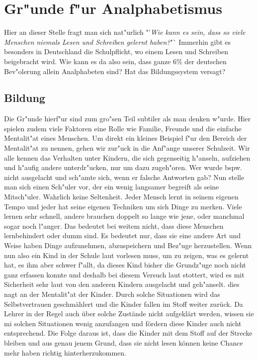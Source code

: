 \section{Gr"unde f"ur Analphabetismus} \label{sec:reasons}



Hier an dieser Stelle fragt man sich nat"urlich "'\textit{Wie kann es sein, dass so viele Menschen niemals Lesen und Schreiben gelernt haben?}"` Immerhin gibt es besonders in Deutschland die Schulpflicht, wo einem Lesen und Schreiben beigebracht wird. Wie kann es da also sein, dass ganze 6\% der deutschen Bev"olerung allein Analphabeten sind? Hat das Bildungssystem versagt? \\


\subsection{Bildung}

Die Gr"unde hierf"ur sind zum gro"sen Teil subtiler als man denken w"urde. Hier spielen zudem viele Faktoren eine Rolle wie Familie, Freunde und die einfache Mentalit"at eines Menschen. Um direkt ein kleines Beispiel f"ur den Bereich der Mentalit"at zu nennen, gehen wir zur"uck in die Anf"ange unserer Schulzeit. Wir alle kennen das Verhalten unter Kindern, die sich gegenseitig h"anseln, aufziehen und h"aufig andere unterdr"ucken, nur um dazu zugeh"oren. Wer wurde bspw. nicht ausgelacht und sch"amte sich, wenn er falsche Antworten gab? Nun stelle man sich einen Sch"uler vor, der ein wenig langsamer begreift als seine Mitsch"uler. Wahrlich keine Seltenheit. Jeder Mensch lernt in seinem eigenen Tempo und jeder hat seine eigenen Techniken um sich Dinge zu merken. Viele lernen sehr schnell, andere brauchen doppelt so lange wie jene, oder manchmal sogar noch l"anger. Das bedeutet bei weitem nicht, dass diese Menschen lernbehindert oder dumm sind. Es bedeutet nur, dass sie eine andere Art und Weise haben Dinge aufzunehmen, abzuspeichern und Bez"uge herzustellen. Wenn nun also ein Kind in der Schule laut vorlesen muss, um zu zeigen, was es gelernt hat, es ihm aber schwer f"allt, da dieses Kind bisher die Grundz"uge noch nicht ganz erfassen konnte und deshalb bei diesem Versuch laut stottert, wird es mit Sicherheit sehr laut von den anderen Kindern ausgelacht und geh"anselt. dies nagt an der Mentalit"at der Kinder. Durch solche Situationen wird das Selbstvertrauen geschmählert und die Kinder fallen im Stoff weiter zurück. Da Lehrer in der Regel auch über solche Zustände nicht aufgeklärt werden, wissen sie mi solchen Situationen wenig anzufangen und fördern diese Kinder auch nicht entsprechend. Die Folge daraus ist, dass die Kinder mit dem Stoff auf der Strecke bleiben und aus genau jenem Grund, dass sie nicht lesen können keine Chance mehr haben richtig hinterherzukommen.\\


